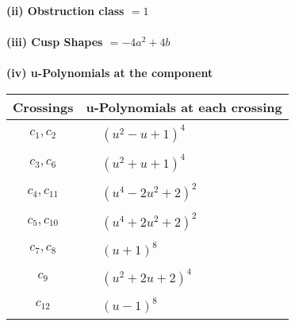 \documentclass[1p]{elsarticle_modified}
\theoremstyle{definition}
\begin{document}
\flushleft \textbf{(ii) Obstruction class $= 1$}\\~\\
\flushleft \textbf{(iii) Cusp Shapes $= -4 a^2+4 b$}\\~\\
\newpage\renewcommand{\arraystretch}{1}
\flushleft \textbf{(iv) u-Polynomials at the component}\newline \\
\begin{tabular}{m{50pt}|m{274pt}}
Crossings & \hspace{64pt}u-Polynomials at each crossing \\
\hline $$\begin{aligned}c_{1},c_{2}\end{aligned}$$&$\begin{aligned}
&(u^2- u+1)^4
\end{aligned}$\\
\hline $$\begin{aligned}c_{3},c_{6}\end{aligned}$$&$\begin{aligned}
&(u^2+u+1)^4
\end{aligned}$\\
\hline $$\begin{aligned}c_{4},c_{11}\end{aligned}$$&$\begin{aligned}
&(u^4-2 u^2+2)^2
\end{aligned}$\\
\hline $$\begin{aligned}c_{5},c_{10}\end{aligned}$$&$\begin{aligned}
&(u^4+2 u^2+2)^2
\end{aligned}$\\
\hline $$\begin{aligned}c_{7},c_{8}\end{aligned}$$&$\begin{aligned}
&(u+1)^8
\end{aligned}$\\
\hline $$\begin{aligned}c_{9}\end{aligned}$$&$\begin{aligned}
&(u^2+2 u+2)^4
\end{aligned}$\\
\hline $$\begin{aligned}c_{12}\end{aligned}$$&$\begin{aligned}
&(u-1)^8
\end{aligned}$\\
\hline
\end{tabular}\\~\\
\end{document}
